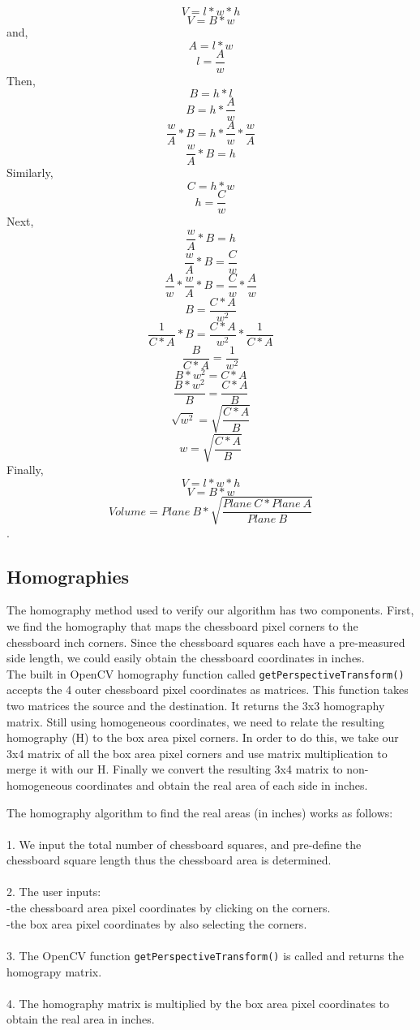\documentclass[11pt, twoside, reqno]{book}
\begin{document}
\[V = l*w*h\]
\[V = B*w\]
and,
\[A = l*w\]
\[l =\frac{A}{w}\]
Then,
\[B = h*l\]
\[B = h*\frac{A}{w}\]
\[\frac{w}{A}*B = h*\frac{A}{w}*\frac{w}{A}\]
\[\frac{w}{A}*B = h\]
Similarly,
\[C = h*w\]
\[h = \frac{C}{w}\]
Next,
\[\frac{w}{A}*B = h\]
\[\frac{w}{A}*B = \frac{C}{w}\]
\[\frac{A}{w}*\frac{w}{A}*B = \frac{C}{w}*\frac{A}{w}\]
\[B = \frac{C*A}{w^2}\]
\[\frac{1}{C*A}*B = \frac{C*A}{w^2}*\frac{1}{C*A}\]
\[\frac{B}{C*A} = \frac{1}{w^2}\]
\[B*w^2= C*A\]
\[\frac{B*w^2}{B} = \frac{C*A}{B}\]
\[\sqrt{w^2} = \sqrt{\frac{C*A}{B}}\]
\[w = \sqrt{\frac{C*A}{B}}\]
Finally,
\[V= l*w*h\] 
\[V= B*w \]
\[Volume =Plane\ B*\sqrt{\frac{Plane\ C*Plane\ A}{Plane\ B}} \].



\subsection{Homographies}



The homography method used to verify our algorithm has two components. First, we find the homography that maps the chessboard pixel corners to the chessboard inch corners. Since the chessboard squares each have a pre-measured side length, we could easily obtain the chessboard coordinates in inches. \\ The built in OpenCV homography function called \texttt{getPerspectiveTransform()} accepts the 4 outer chessboard pixel coordinates as matrices. This function takes two matrices the source and the destination. It returns the 3x3 homography matrix. Still using homogeneous coordinates, we need to relate the resulting homography (H) to the box area pixel corners. In order to do this, we take our 3x4 matrix of all the box area pixel corners and use matrix multiplication to merge it with our H. Finally we convert the resulting 3x4 matrix to non-homogeneous coordinates and obtain the real area of each side in inches. 

The homography algorithm to find the real areas (in inches) works as follows:
\\ \\
1. We input the total number of chessboard squares, and pre-define the chessboard square length thus the chessboard area is determined. \\ \\
2. The user inputs: \\ 
-the chessboard area pixel coordinates by clicking on the corners. \\
-the box area pixel coordinates by also selecting the corners.\\ \\
3. The OpenCV function \texttt{getPerspectiveTransform()} is called and returns the homograpy matrix. \\ \\
4. The homography matrix is multiplied by the box area pixel coordinates to obtain the real area in inches. 
\end{document}
